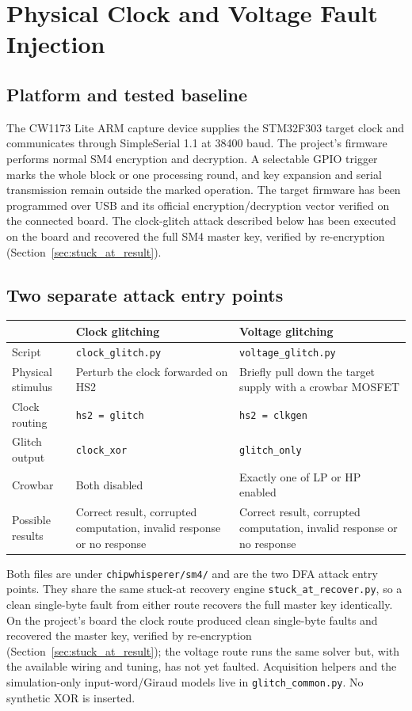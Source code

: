 \chapter{Physical Clock and Voltage Fault Injection}
\label{chap:physical_fi}
\section{Platform and tested baseline}
The CW1173 Lite ARM capture device supplies the STM32F303 target clock and communicates through SimpleSerial 1.1 at 38400 baud. The project's firmware performs normal SM4 encryption and decryption. A selectable GPIO trigger marks the whole block or one processing round, and key expansion and serial transmission remain outside the marked operation.
The target firmware has been programmed over USB and its official encryption/decryption vector verified on the connected board. The clock-glitch attack described below has been executed on the board and recovered the full SM4 master key, verified by re-encryption (Section~\ref{sec:stuck_at_result}).
\section{Two separate attack entry points}
\begin{center}\begin{tabular}{P{.25\linewidth}P{.32\linewidth}P{.32\linewidth}}\toprule
 & Clock glitching & Voltage glitching\\\midrule
Script & \texttt{clock\_glitch.py} & \texttt{voltage\_glitch.py}\\
Physical stimulus & Perturb the clock forwarded on HS2 & Briefly pull down the target supply with a crowbar MOSFET\\
Clock routing & \texttt{hs2 = glitch} & \texttt{hs2 = clkgen}\\
Glitch output & \texttt{clock\_xor} & \texttt{glitch\_only}\\
Crowbar & Both disabled & Exactly one of LP or HP enabled\\
Possible results & Correct result, corrupted computation, invalid response or no response & Correct result, corrupted computation, invalid response or no response\\\bottomrule
\end{tabular}\end{center}
Both files are under \texttt{chipwhisperer/sm4/} and are the two DFA attack entry points. They share the same stuck-at recovery engine \texttt{stuck\_at\_recover.py}, so a clean single-byte fault from either route recovers the full master key identically. On the project's board the clock route produced clean single-byte faults and recovered the master key, verified by re-encryption (Section~\ref{sec:stuck_at_result}); the voltage route runs the same solver but, with the available wiring and tuning, has not yet faulted. Acquisition helpers and the simulation-only input-word/Giraud models live in \texttt{glitch\_common.py}. No synthetic XOR is inserted.
